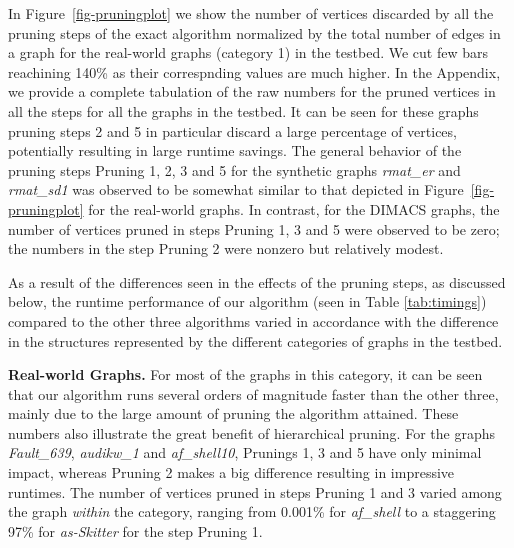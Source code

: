 In Figure~\ref{fig-pruningplot} we show the number of vertices discarded by all
the  pruning steps of the exact algorithm normalized by the total number of edges
in a graph for the real-world graphs (category 1) in the testbed. We cut few bars reachining
140\% as their correspnding values are much higher.
In the Appendix, we provide a complete tabulation of the raw numbers for the pruned vertices in all the steps for all the graphs in the testbed. It can be seen for these graphs pruning steps 2 and 5 in particular discard a large percentage of vertices, potentially resulting in large runtime savings. The general behavior of the pruning steps Pruning 1, 2, 3 and 5 for the synthetic graphs {\em rmat\_er} and {\em rmat\_sd1} was observed to be somewhat similar to that depicted in Figure~\ref{fig-pruningplot} for the real-world graphs. In contrast, for the DIMACS graphs, the number of vertices pruned in steps Pruning 1, 3 and 5 were observed to be zero; the numbers in the step Pruning 2 were nonzero but relatively modest.


As a result  of the differences seen in the effects of the pruning steps, as discussed below,
the runtime performance of our algorithm (seen in Table \ref{tab:timings}) compared
to the other three algorithms varied in accordance with the difference in the structures represented 
by the different categories of graphs in the testbed.

{\bf Real-world Graphs. }
For most of the graphs in this category, it can be seen that our algorithm runs several orders of magnitude faster than the other three, mainly due to the large amount of pruning the algorithm attained. These numbers also illustrate the great benefit of hierarchical pruning. 
For the graphs {\em Fault\_639}, {\em audikw\_1} and {\em af\_shell10}, 
Prunings 1, 3 and 5 have only minimal impact,
whereas Pruning 2 makes a big difference resulting in impressive runtimes. 
The number of vertices pruned in steps Pruning 1 and 3 varied among the 
graph {\em within} the
category, ranging from 0.001\% for {\it af\_shell} to a staggering 97\% for {\it as-Skitter} 
for the step Pruning 1. 



